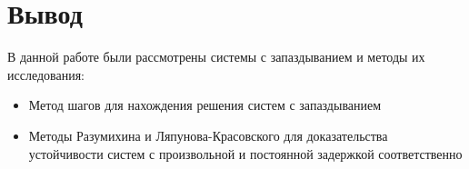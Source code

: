     \section*{Вывод}
    В данной работе были рассмотрены системы с запаздыванием и методы их исследования:
    \begin{itemize}
        \item Метод шагов для нахождения решения систем с запаздыванием
        \item Методы Разумихина и Ляпунова-Красовского для доказательства устойчивости систем с произвольной и постоянной задержкой соответственно
    \end{itemize}

